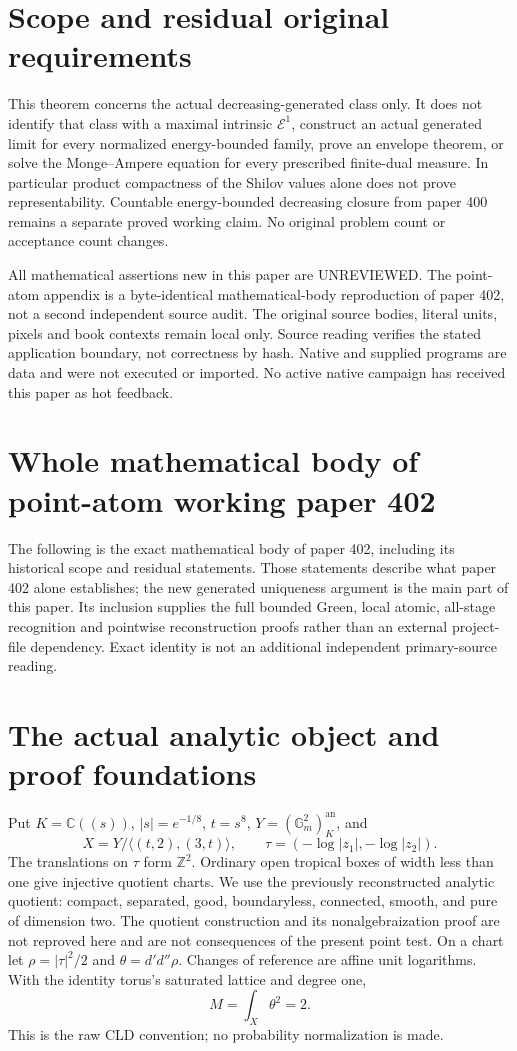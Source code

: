 \documentclass[11pt]{article}
\newcommand{\DD}{d'd''}
\theoremstyle{remark}\newtheorem{remark}[theorem]{Remark}
\begin{document}
\section{Scope and residual original requirements}
This theorem concerns the actual decreasing-generated
class only. It does not identify that class with a
maximal intrinsic $\mathcal E^1$, construct an actual
generated limit for every normalized energy-bounded
family, prove an envelope theorem, or solve the
Monge--Ampere equation for every prescribed finite-dual
measure. In particular product compactness of the
Shilov values alone does not prove representability.
Countable energy-bounded decreasing closure from
paper 400 remains a separate proved working claim.
No original problem count or acceptance count changes.

All mathematical assertions new in this paper are
UNREVIEWED. The point-atom appendix is a byte-identical
mathematical-body reproduction of paper 402, not a
second independent source audit. The original source
bodies, literal units, pixels and book contexts remain
local only. Source reading verifies the stated
application boundary, not correctness by hash. Native
and supplied programs are data and were not executed
or imported. No active native campaign has received
this paper as hot feedback.

\clearpage
\appendix
\section*{Whole mathematical body of point-atom working paper 402}
The following is the exact mathematical body of paper 402,
including its historical scope and residual statements. Those
statements describe what paper 402 alone establishes; the new
generated uniqueness argument is the main part of this paper.
Its inclusion supplies the full bounded Green, local atomic,
all-stage recognition and pointwise reconstruction proofs rather
than an external project-file dependency. Exact identity is not
an additional independent primary-source reading.
\section{The actual analytic object and proof foundations}
Put $K=\mathbb C((s))$, $|s|=e^{-1/8}$, $t=s^8$,
$Y=(\mathbb G_m^2)^{\mathrm{an}}_K$, and
\[
 X=Y/\langle(t,2),(3,t)\rangle,\qquad
 \tau=(-\log|z_1|,-\log|z_2|).
\]
The translations on $\tau$ form $\mathbb Z^2$. Ordinary open tropical
boxes of width less than one give injective quotient charts. We use
the previously reconstructed analytic quotient: compact, separated,
good, boundaryless, connected, smooth, and pure of dimension two.
The quotient construction and its nonalgebraization proof are not
reproved here and are not consequences of the present point test.
On a chart let $\rho=|\tau|^2/2$ and $\theta=\DD\rho$.
Changes of reference are affine unit logarithms. With the identity
torus's saturated lattice and degree one,
\[
 M=\int_X\theta^2=2.
\]
This is the raw CLD convention; no probability normalization is made.
\end{document}
